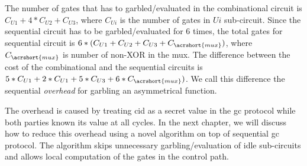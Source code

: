 The number of gates that has to garbled/evaluated in the combinational circuit is $C_{U1}+4*C_{U2}+C_{U3}$, where $C_{Ui}$ is the number of gates in $Ui$ sub-circuit.
Since the sequential circuit has to be garbled/evaluated for 6 times, the total gates for sequential circuit is $6*(C_{U1}+C_{U2}+C_{U3}+C_{\acrshort{mux}})$, where $C_{\acrshort{mux}}$ is number of non-XOR in the \acrshort{mux}.
The difference between the cost of the combinational and the sequential circuits is $5*C_{U1}+2*C_{U1}+5*C_{U3}+6*C_{\acrshort{mux}})$.
We call this difference the sequential \textit{overhead} for garbling an asymmetrical function.

The overhead is caused by treating cid as a secret value in the \acrshort{gc} protocol while both parties known its value at all cycles.
In the next chapter, we will discuss how to reduce this overhead using a novel algorithm on top of sequential \acrshort{gc} protocol.
The algorithm skips unnecessary garbling/evaluation of idle sub-circuits and allows local computation of the gates in the control path.
